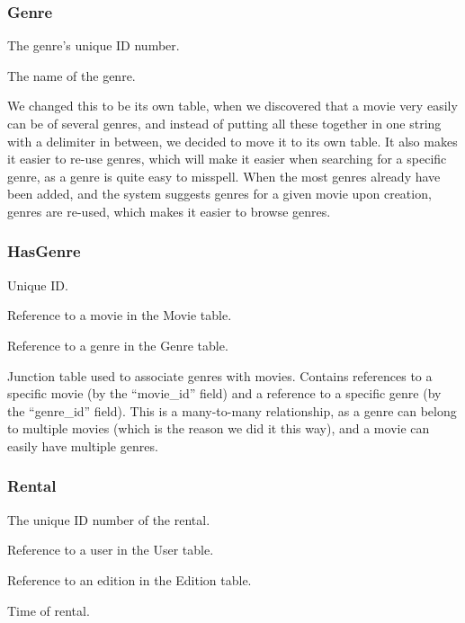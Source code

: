 \subsubsection{Genre}
\label{Design_Database_Tables_Genre}

\begin{my_description}
\item[genre\_id] The genre's unique ID number.
\item[name] The name of the genre.
\end{my_description}

We changed this to be its own table, when we discovered that a movie very easily can be of several genres, and instead of putting all these together in one string with a delimiter in between, we decided to move it to its own table. It also makes it easier to re-use genres, which will make it easier when searching for a specific genre, as a genre is quite easy to misspell. When the most genres already have been added, and the system suggests genres for a given movie upon creation, genres are re-used, which makes it easier to browse genres.

\subsubsection{HasGenre}
\label{Design_Database_Tables_HasGenre}

\begin{my_description}
\item[hasgenre\_id] Unique ID.
\item[movie\_id] Reference to a movie in the Movie table.
\item[genre\_id] Reference to a genre in the Genre table.
\end{my_description}

Junction table used to associate genres with movies. Contains references to a specific movie (by the ``movie\_id'' field) and a reference to a specific genre (by the ``genre\_id'' field). This is a many-to-many relationship, as a genre can belong to multiple movies (which is the reason we did it this way), and a movie can easily have multiple genres.

\subsubsection{Rental}
\label{Design_Database_Tables_Rental}

\begin{my_description}
\item[rental\_id] The unique ID number of the rental.
\item[user\_id] Reference to a user in the User table.
\item[edition\_id] Reference to an edition in the Edition table.
\item[time] Time of rental.
\end{my_description}

